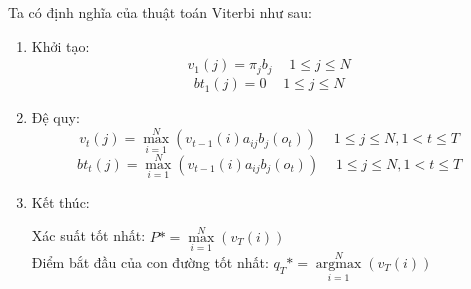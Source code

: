 Ta có định nghĩa của thuật toán Viterbi như sau:
\begin{enumerate}
\item Khởi tạo:
$${v_1}\left( j \right) = {\pi _j}{b_j}\begin{array}{*{20}{c}}
  {}&{1 \leqslant j \leqslant N} 
\end{array}$$
$$b{t_1}\left( j \right) = 0\begin{array}{*{20}{c}}
  {}&{1 \leqslant j \leqslant N} 
\end{array}$$
\item Đệ quy:
$${v_t}\left( j \right) = \mathop {\max }\limits_{i = 1}^N \left( {v{}_{t - 1}\left( i \right){a_{ij}}{b_j}\left( {{o_t}} \right)} \right)\begin{array}{*{20}{c}}
  {}&{1 \leqslant j \leqslant N,1 < t \leqslant T} 
\end{array}$$
$$b{t_t}\left( j \right) = \mathop {\max }\limits_{i = 1}^N \left( {v{}_{t - 1}\left( i \right){a_{ij}}{b_j}\left( {{o_t}} \right)} \right)\begin{array}{*{20}{c}}
  {}&{1 \leqslant j \leqslant N,1 < t \leqslant T} 
\end{array}$$
\item Kết thúc:\\
\begin{center}
Xác suất tốt nhất: $P* = \mathop {\max }\limits_{i = 1}^N \left( {{v_T}\left( i \right)} \right)$\\
Điểm bắt đầu của con đường tốt nhất: $q_T* = \mathop {\arg \max }\limits_{i = 1}^N \left( {{v_T}\left( i \right)} \right)$
\end{center}
\end{enumerate}
